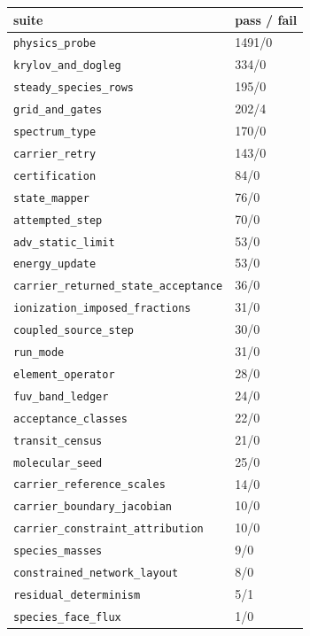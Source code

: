 \documentclass[english,a4paper]{my_memo}
\begin{document}
\begin{itemize}
  {\def\LTcaptype{none} %
  {\small
\begin{longtable}[]{@{}ll@{}}
  \toprule\noalign{}
  suite & pass / fail \\
  \midrule\noalign{}
  \endhead
  \bottomrule\noalign{}
  \endlastfoot
  \texttt{physics\_probe} & 1491/0 \\
  \texttt{krylov\_and\_dogleg} & 334/0 \\
  \texttt{steady\_species\_rows} & 195/0 \\
  \texttt{grid\_and\_gates} & 202/4 \\
  \texttt{spectrum\_type} & 170/0 \\
  \texttt{carrier\_retry} & 143/0 \\
  \texttt{certification} & 84/0 \\
  \texttt{state\_mapper} & 76/0 \\
  \texttt{attempted\_step} & 70/0 \\
  \texttt{adv\_static\_limit} & 53/0 \\
  \texttt{energy\_update} & 53/0 \\
  \texttt{carrier\_returned\_state\_acceptance} & 36/0 \\
  \texttt{ionization\_imposed\_fractions} & 31/0 \\
  \texttt{coupled\_source\_step} & 30/0 \\
  \texttt{run\_mode} & 31/0 \\
  \texttt{element\_operator} & 28/0 \\
  \texttt{fuv\_band\_ledger} & 24/0 \\
  \texttt{acceptance\_classes} & 22/0 \\
  \texttt{transit\_census} & 21/0 \\
  \texttt{molecular\_seed} & 25/0 \\
  \texttt{carrier\_reference\_scales} & 14/0 \\
  \texttt{carrier\_boundary\_jacobian} & 10/0 \\
  \texttt{carrier\_constraint\_attribution} & 10/0 \\
  \texttt{species\_masses} & 9/0 \\
  \texttt{constrained\_network\_layout} & 8/0 \\
  \texttt{residual\_determinism} & 5/1 \\
  \texttt{species\_face\_flux} & 1/0 \\
  \end{longtable}
}
  }


\end{itemize}
\end{document}

